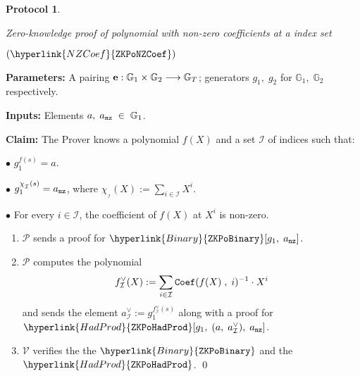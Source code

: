\documentclass[11pt, lettersize, notitlepage, leqno, footskip=0.6cm]{article}
\newcommand{\lra}{\longrightarrow}
\newcommand{\mc}{\mathcal}
\newcommand{\mb}{\mathbb}
\newcommand{\mP}{\mc{P}}
\newcommand{\V}{\mc{V}}
\newcommand{\vs}{\vspace{-0.15cm}}
\newcommand{\noin}{\noindent}
\newtheorem{Prot}[Thm]{Protocol}
\numberwithin{equation}{section}
\begin{document}
\begin{mdframed}
\begin{Prot} \hypertarget{NZCoef}{Zero-knowledge proof of polynomial with non-zero coefficients at a index set} $(\hyperlink{NZCoef}{\tt{ZKPoNZCoef}})$\end{Prot}  

\noindent \textbf{Parameters:} A pairing ${\bf{e}}:\mb{G}_1\times \mb{G}_2\lra \mb{G}_T$; generators $g_1,\;g_2$ for $\mb{G}_1,\; \mb{G}_2$ respectively.


\noindent \textbf{Inputs:} Elements $a,\; a_{\tt{nz}}\;\in \;\mb{G}_1$.

\noindent \textbf{Claim:} The Prover knows a polynomial $f(X)$ and a set $\mc{I}$ of indices such that: \vspace{2mm}

\noin $\bullet$ $g_1^{f(s)} = a$. \vspace{1mm}

\noin $\bullet$ $g_1^{\chi_{_\mc{I}}(s)} =a_{\tt{nz}}$, where $\chi_{_\mc{I}}(X):= \sum\limits_{i\in \mc{I}} X^i. $ \vspace{1mm}

\noin $\bullet$ For every $i\in \mc{I}$, the coefficient of $f(X)$ at $X^i$ is non-zero.

\begin{enumerate}[wide, labelwidth=!, labelindent=0pt, itemsep=-0.2ex] 

\item $\mP$ sends a proof for $\hyperlink{Binary}{\tt{ZKPoBinary}}[g_1,\;a_{\tt{nz}}]$.

\item $\mP$ computes the polynomial \vs $$ f_{\mc{I}}^{\vee}(X):=  \sum\limits_{i\in \mc{I}} {\tt{Coef}}(f(X)\;,\;i)^{-1}\cdot X^i  \vs $$ and sends the element $a_{\mc{I}}^{\vee}:= g_1^{f_{\mc{I}}^{\vee}(s)}$ along with a proof for $\hyperlink{HadProd}{\tt{ZKPoHadProd}}[g_1,\;(a,\;a_{\mc{I}}^{\vee}),\;a_{\tt{nz}}]$.


\item $\V$ verifies the the $\hyperlink{Binary}{\tt{ZKPoBinary}}$ and the $\hyperlink{HadProd}{\tt{ZKPoHadProd}}$. 
\qed

\end{enumerate} \end{mdframed} 
\end{document}

